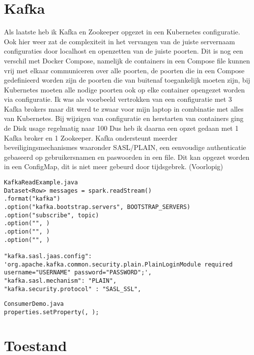 \section{Kafka}

Als laatste heb ik Kafka en Zookeeper opgezet in een Kubernetes configuratie. Ook hier weer zat de complexiteit in het vervangen van de juiste servernaam configuraties door localhost en openzetten van de juiste poorten.
Dit is nog een verschil met Docker Compose, namelijk de containers in een Compose file kunnen vrij met elkaar communiceren over alle poorten, de poorten die in een Compose gedefinieerd worden zijn de poorten die van buitenaf toegankelijk moeten zijn, bij Kubernetes moeten alle nodige poorten ook op elke container opengezet worden via configuratie.
\newline
\newline
Ik was als voorbeeld vertrokken van een configuratie met 3 Kafka brokers maar dit werd te zwaar voor mijn laptop in combinatie met alles van Kubernetes. Bij wijzigen van configuratie en herstarten van containers ging de Disk usage regelmatig naar 100%
Dus heb ik daarna een opzet gedaan met 1 Kafka broker en 1 Zookeeper.
\newline
\newline
Kafka ondersteunt meerder beveiligingsmechanismes waaronder SASL/PLAIN, een eenvoudige authenticatie gebaseerd op gebruikersnamen en paswoorden in een file.
\newline
\newline
Dit kan opgezet worden in een ConfigMap, dit is niet meer gebeurd door tijdsgebrek. (Voorlopig)
\newline
\newline
[TODO]
\begin{lstlisting}
KafkaReadExample.java
Dataset<Row> messages = spark.readStream()
.format("kafka")
.option("kafka.bootstrap.servers", BOOTSTRAP_SERVERS)
.option("subscribe", topic)
.option("", )
.option("", )
.option("", )

"kafka.sasl.jaas.config": 'org.apache.kafka.common.security.plain.PlainLoginModule required username="USERNAME" password="PASSWORD";',
"kafka.sasl.mechanism": "PLAIN",
"kafka.security.protocol" : "SASL_SSL",
\end{lstlisting}
\begin{lstlisting}
ConsumerDemo.java
properties.setProperty(, );
\end{lstlisting}
\section{Toestand}

